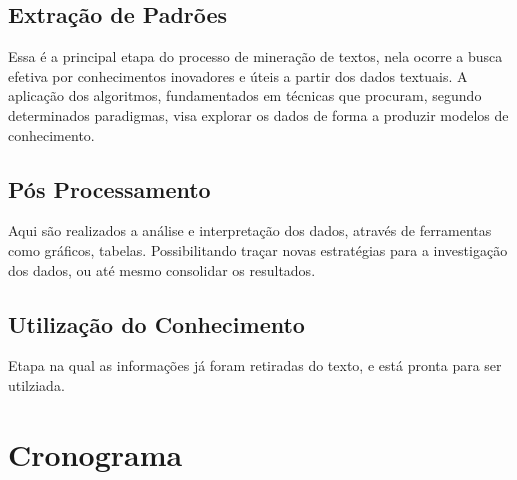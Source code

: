 \subsection{Extração de Padrões}

Essa é a principal etapa do processo de mineração de textos, nela ocorre a busca efetiva por conhecimentos inovadores e úteis a partir dos dados textuais. A aplicação dos algoritmos, fundamentados em técnicas que procuram, segundo determinados paradigmas, visa explorar os dados de forma a produzir modelos de conhecimento. 

\subsection{Pós Processamento}

Aqui são realizados a análise e interpretação dos dados, através de ferramentas como gráficos, tabelas. Possibilitando traçar novas estratégias para a investigação dos dados, ou até mesmo consolidar os resultados.

\subsection{Utilização do Conhecimento}

Etapa na qual as informações já foram retiradas do texto, e está pronta para ser utilziada.


\section{Cronograma}

